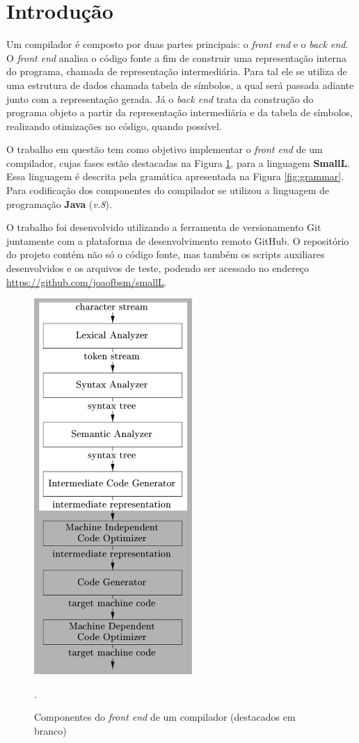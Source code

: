 \section{Introdução}

Um compilador é composto por duas partes principais: o \textit{front end} e o \textit{back end}. O \textit{front end} analisa o código fonte a fim de construir uma representação interna do programa, chamada de representação intermediária. Para tal ele se utiliza de uma estrutura de dados chamada tabela de símbolos, a qual será passada adiante junto com a representação gerada. Já o \textit{back end} trata da construção do programa objeto a partir da representação intermediária e da tabela de símbolos, realizando otimizações no código, quando possível.

O trabalho em questão tem como objetivo implementar o \textit{front end} de um compilador, cujas fases estão destacadas na Figura \ref{fig:front_end}, para a linguagem \textbf{SmallL}. Essa linguagem é descrita pela gramática apresentada na Figura \ref{fig:grammar}. Para codificação dos componentes do compilador se utilizou a linguagem de programação \textbf{Java} (\textit{v.8}). 

O trabalho foi desenvolvido utilizando a ferramenta de versionamento Git juntamente com a plataforma de desenvolvimento remoto GitHub. O repositório do projeto contém não só o código fonte, mas também os scripts auxiliares desenvolvidos e os arquivos de teste, podendo ser acessado no endereço \url{https://github.com/joaofbsm/smallL}.

\begin{figure}[H]
 	\centering
	\includegraphics[width=6cm,keepaspectratio]{imgs/front_end.png}
	\caption{Componentes do \textit{front end} de um compilador (destacados em branco)}.
	\label{fig:front_end}
\end{figure}


